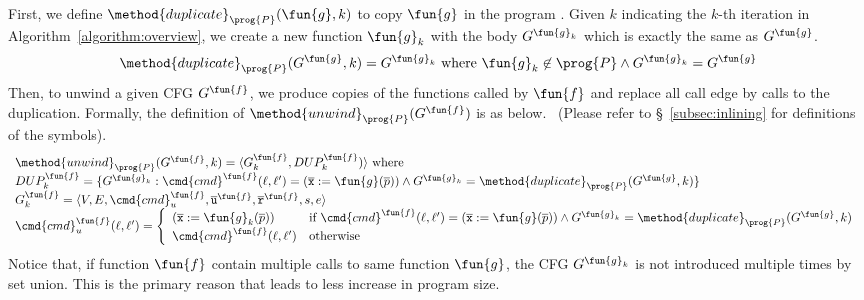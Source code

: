 
First, we define $\method{duplicate}_\prog{P}(\fun{g}, k)$ to copy $\fun{g}$ in
the program .
Given $k$ indicating the $k$-th iteration in Algorithm~\ref{algorithm:overview},
we create a new function $\fun{g}_k$ with the body $G^{\fun{g}_k}$ which is
exactly the same as $G^\fun{g}$.
\[
  \method{duplicate}_\prog{P}(G^\fun{g}, k)
    = G^{\fun{g}_k} \text{ where } \fun{g}_k \not\in \prog{P} \land G^{\fun{g}_k}=G^\fun{g}
\]
Then, to unwind a given CFG $G^\fun{f}$, we produce copies of the functions
called by $\fun{f}$ and replace all call edge by calls to the duplication.
Formally, the definition of $\method{unwind}_\prog{P}(G^\fun{f})$ is as below.
~(Please refer to \S~\ref{subsec:inlining} for definitions of the symbols).
\[
\begin{array}{l}
\method{unwind}_\prog{P}(G^\fun{f}, k)
  = \langle G^\fun{f}_k, DUP^\fun{f}_k) \rangle \text{ where} \\
DUP^\fun{f}_k = \{G^{\fun{g}_k} :
    \cmd{cmd}^\fun{f}(\ell,\ell')=(\overline{\texttt{x}}:=\fun{g}(\overline{p}))
    \land G^{\fun{g}_k} = \method{duplicate}_\prog{P}(G^\fun{g}, k)
  \}\\
G^\fun{f}_k = \langle V, E,\cmd{cmd}_u^\fun{f}, \overline{\texttt{u}}^\fun{f},
      \overline{\texttt{r}}^\fun{f},s,e \rangle \\
{%
\cmd{cmd}_u^\fun{f} (\ell, \ell') =
\left\{
  \begin{array}{ll}
  (\overline{\texttt{x}}:=\fun{g}_k(\overline{p})) &\text{if } 
    \cmd{cmd}^\fun{f}(\ell,\ell')=(\overline{\texttt{x}}:=\fun{g}(\overline{p}))
    \land G^{\fun{g}_k} = \method{duplicate}_\prog{P}(G^\fun{g}, k)\\
  \cmd{cmd}^\fun{f}(\ell,\ell') &\text{otherwise}
  \end{array}
\right.
}
\end{array}
\]
Notice that, if function $\fun{f}$ contain multiple calls to same function
$\fun{g}$,
the CFG $G^{\fun{g}_k}$ is not introduced multiple times by set union.
This is the primary reason that leads to less increase in program size.

